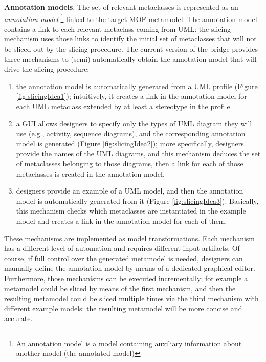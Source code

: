 \textbf{Annotation models}. 
The set of relevant metaclasses is represented as an \textit{annotation model}
\footnote{An annotation model is a model containing auxiliary information about another model (the annotated model)\cite{MCDFthesis}} linked to the target MOF metamodel.
The annotation model contains a link to each relevant metaclass coming from UML: the slicing mechanism uses those links to identify the initial set of metaclasses that will not be sliced out by the slicing procedure.
The current version of the bridge provides three mechanisms to (semi) automatically obtain the annotation model that will drive the slicing procedure:
%
\begin{enumerate}
	\item the annotation model is automatically generated from a UML profile (Figure \ref{fig:slicingIdea1}); intuitively, it creates a link in the annotation model
	for each UML metaclass extended by at least a stereotype in the profile.
	\item a GUI allows designers to specify only the types of UML diagram they will use (e.g., activity, sequence diagrams), and the corresponding annotation model
	is generated (Figure \ref{fig:slicingIdea2}); more specifically, designers provide the names of the UML diagrams, and this mechanism deduces the set of metaclasses belonging to those diagrams, 
	then a link for each of those metaclasses is created in the annotation model.
	\item designers provide an example of a UML model, and then the annotation model is automatically generated from it (Figure \ref{fig:slicingIdea3}).
	Basically, this mechanism checks which metaclasses are instantiated in the example model and creates a link in the annotation model for each of them.
\end{enumerate}
%
These mechanisms are implemented as model transformations. Each mechanism has a different level of automation and requires different input artifacts. 
Of course, if full control over the generated metamodel is needed, designers can manually define the annotation model by means of a dedicated graphical editor.
Furthermore, those mechanisms can be executed incrementally; 
for example a metamodel could be sliced by means of the first
mechanism, and then the resulting metamodel could be sliced multiple times via the third mechanism with different example models: the resulting metamodel will be more concise and accurate.
%

